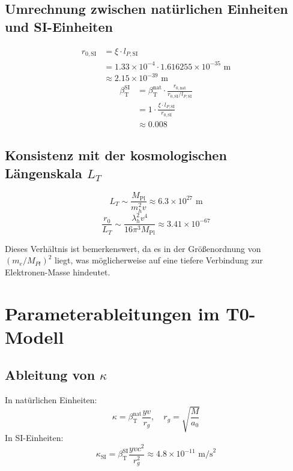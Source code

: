 \documentclass[12pt,a4paper]{article}
\newcommand{\Mpl}{M_{\text{Pl}}}
\newcommand{\betaT}{\beta_{\text{T}}}
\begin{document}
	\subsection{Umrechnung zwischen natürlichen Einheiten und SI-Einheiten}
	
	\begin{align}
		r_{0,\text{SI}} &= \xi \cdot l_{P,\text{SI}} \\
		&= 1.33 \times 10^{-4} \cdot 1.616255 \times 10^{-35} \text{ m} \\
		&\approx 2.15 \times 10^{-39} \text{ m}
	\end{align}
	\begin{align}
		\betaT^{\text{SI}} &= \betaT^{\text{nat}} \cdot \frac{r_{0,\text{nat}}}{r_{0,\text{SI}}/l_{P,\text{SI}}} \\
		&= 1 \cdot \frac{\xi \cdot l_{P,\text{SI}}}{r_{0,\text{SI}}} \\
		&\approx 0.008
	\end{align}
	
	\subsection{Konsistenz mit der kosmologischen Längenskala \(L_T\)}
	
	\begin{equation}
		L_T \sim \frac{\Mpl}{m_h^2 v} \approx 6.3 \times 10^{27} \text{ m}
	\end{equation}
	\begin{equation}
		\frac{r_0}{L_T} \sim \frac{\lambda_h^2 v^4}{16\pi^3 \Mpl} \approx 3.41 \times 10^{-67}
	\end{equation}
	
	Dieses Verhältnis ist bemerkenswert, da es in der Größenordnung von $(m_e/M_{Pl})^2$ liegt, was möglicherweise auf eine tiefere Verbindung zur Elektronen-Masse hindeutet.
	
	\section{Parameterableitungen im T0-Modell}
	
	\subsection{Ableitung von \(\kappa\)}
	
	\begin{theorem}
		In natürlichen Einheiten:
		\begin{equation}
			\kappa = \betaT^{\text{nat}} \frac{y v}{r_g}, \quad r_g = \sqrt{\frac{M}{a_0}}
		\end{equation}
		In SI-Einheiten:
		\begin{equation}
			\kappa_{\text{SI}} = \betaT^{\text{SI}} \frac{y v c^2}{r_g^2} \approx 4.8 \times 10^{-11} \text{ m/s}^2
		\end{equation}
	\end{theorem}
	
\end{document}
